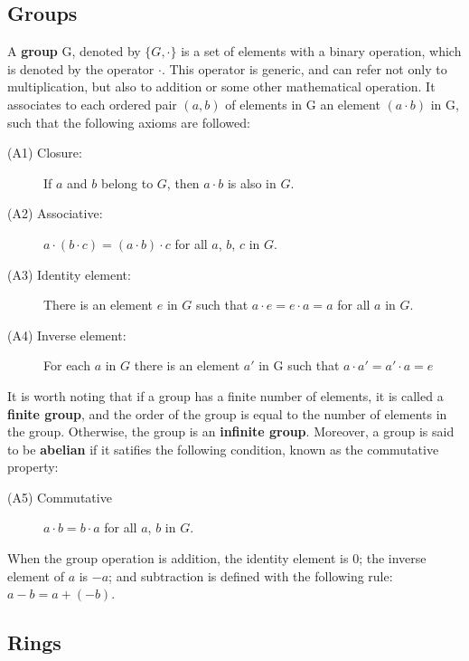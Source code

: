 \subsection{Groups}

A \textbf{group} G, denoted by $\{ G, \cdot \}$ is a set of elements with a binary operation, which is denoted by the operator $\cdot$. This operator is generic, and can refer not only to multiplication, but also to addition or some other mathematical operation. It associates to each ordered pair $(a, b)$ of elements in G an element $(a \cdot b)$ in G, such that the following axioms are followed:
\begin{description}
  \item[(A1) Closure:] If $a$ and $b$ belong to $G$, then $a \cdot b$ is also in $G$.
  \item[(A2) Associative:] $a \cdot (b \cdot c) = (a \cdot b) \cdot c $ for all $a$, $b$, $c$ in $G$.
  \item[(A3) Identity element:] There is an element $e$ in $G$ such that $a \cdot e = e \cdot a = a$ for all $a$ in $G$.
  \item[(A4) Inverse element:] For each $a$ in $G$ there is an element $a'$ in G such that $a \cdot a' = a' \cdot a = e$ 
\end{description}
It is worth noting that if a group has a finite number of elements, it is called a \textbf{finite group}, and the order of the group is equal to the number of elements in the group. Otherwise, the group is an \textbf{infinite group}. Moreover, a group is said to be \textbf{abelian} if it satifies the following condition, known as the commutative property:
\begin{description}
  \item[(A5) Commutative] $a \cdot b = b \cdot a$ for all $a$, $b$ in $G$.
\end{description}

When the group operation is addition, the identity element is 0; the inverse element of $a$ is $-a$; and subtraction is defined with the following rule: $a-b = a+(-b)$. 
  
\subsection{Rings}

